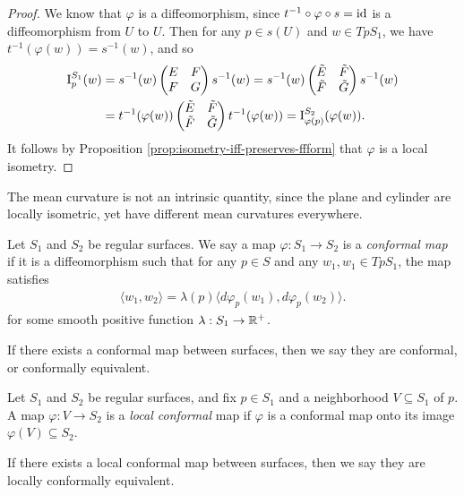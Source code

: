\begin{proof}
    We know that $\varphi$ is a diffeomorphism, since $t^{-1} \circ \varphi \circ s = \operatorname{id}$ is a diffeomorphism from $U$ to $U$. Then for any $p \in s(U)$ and $w \in TpS_1$, we have $t^{-1}(\varphi(w)) = s^{-1}(w)$, and so
    \begin{align*}
        \operatorname{I}_{p}^{S_1}(w) &= s^{-1}(w)\begin{pmatrix}
            E & F \\
            F & G
        \end{pmatrix}s^{-1}(w) = s^{-1}(w)\begin{pmatrix}
            \tilde{E} & \tilde{F} \\
            \tilde{F} & \tilde{G}
        \end{pmatrix}s^{-1}(w) \\
        &= t^{-1}(\varphi(w))\begin{pmatrix}
            \tilde{E} & \tilde{F} \\
            \tilde{F} & \tilde{G}
        \end{pmatrix}t^{-1}(\varphi(w)) = \operatorname{I}_{\varphi(p)}^{S_2}(\varphi(w)).
    \end{align*}
    It follows by Proposition \ref{prop:isometry-iff-preserves-ffform} that $\varphi$ is a local isometry.
\end{proof}

\begin{cor}
    The mean curvature is not an intrinsic quantity, since the plane and cylinder are locally isometric, yet have different mean curvatures everywhere.
\end{cor}

\begin{defn}
    Let $S_1$ and $S_2$ be regular surfaces.  We say a map $\varphi: S_1 \to S_2$ is a \emph{conformal map} if it is a diffeomorphism such that for any $p \in S$ and any $w_1, w_1 \in TpS_1$, the map satisfies
    \begin{align*}
        \langle w_1, w_2\rangle = \lambda(p)\langle d\varphi_p(w_1), d\varphi_p(w_2)\rangle.
    \end{align*}
    for some smooth positive function $\lambda: S_1 \to \mathbb{R}^+$.

    If there exists a conformal map between surfaces, then we say they are conformal, or conformally equivalent.
\end{defn}

\begin{defn}
    Let $S_1$ and $S_2$ be regular surfaces, and fix $p \in S_1$ and a neighborhood $V \subseteq S_1$ of $p$. A map $\varphi: V \to S_2$ is a \emph{local conformal} map if $\varphi$ is a conformal map onto its image $\varphi(V) \subseteq S_2$.

    If there exists a local conformal map between surfaces, then we say they are locally conformally equivalent.
\end{defn}


